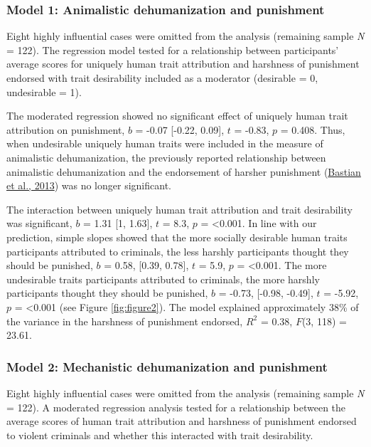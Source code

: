 \documentclass[
]{article}
\begin{document}
\hypertarget{model-1-animalistic-dehumanization-and-punishment-2}{%
\subsubsection{Model 1: Animalistic dehumanization and punishment}\label{model-1-animalistic-dehumanization-and-punishment-2}}

Eight highly influential cases were omitted from the analysis (remaining sample \emph{N} = 122). The regression model tested for a relationship between participants' average scores for uniquely human trait attribution and harshness of punishment endorsed with trait desirability included as a moderator (desirable = 0, undesirable = 1).

The moderated regression showed no significant effect of uniquely human trait attribution on punishment, \(b\) = -0.07 {[}-0.22, 0.09{]}, \(t\) = -0.83, \(p\) = 0.408. Thus, when undesirable uniquely human traits were included in the measure of animalistic dehumanization, the previously reported relationship between animalistic dehumanization and the endorsement of harsher punishment (\protect\hyperlink{ref-Bastian2013}{Bastian et al., 2013}) was no longer significant.

The interaction between uniquely human trait attribution and trait desirability was significant, \(b\) = 1.31 {[}1, 1.63{]}, \(t\) = 8.3, \(p\) = \textless0.001. In line with our prediction, simple slopes showed that the more socially desirable human traits participants attributed to criminals, the less harshly participants thought they should be punished, \(b\) = 0.58, {[}0.39, 0.78{]}, \(t\) = 5.9, \(p\) = \textless0.001. The more undesirable traits participants attributed to criminals, the more harshly participants thought they should be punished, \(b\) = -0.73, {[}-0.98, -0.49{]}, \(t\) = -5.92, \(p\) = \textless0.001 (see Figure \ref{fig:figure2}). The model explained approximately 38\% of the variance in the harshness of punishment endorsed, \(R^2\) = 0.38, \(F\)(3, 118) = 23.61.

\hypertarget{model-2-mechanistic-dehumanization-and-punishment-2}{%
\subsubsection{Model 2: Mechanistic dehumanization and punishment}\label{model-2-mechanistic-dehumanization-and-punishment-2}}

Eight highly influential cases were omitted from the analysis (remaining sample \emph{N} = 122). A moderated regression analysis tested for a relationship between the average scores of human trait attribution and harshness of punishment endorsed to violent criminals and whether this interacted with trait desirability.
\end{document}
